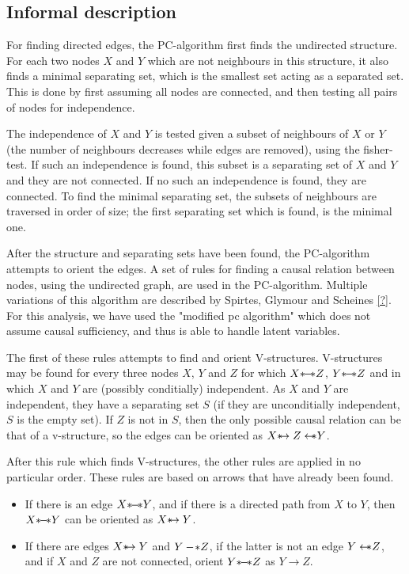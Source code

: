 \documentclass[a4paper, 10pt, english, onecolumn]{article}
\def \srightarrow {\text{\textasteriskcentered}\hspace{-0.62em}\rightarrow}
\def \sleftarrow {\leftarrow\hspace{-0.62em}\text{\textasteriskcentered}}
\def \sleftline {-\hspace{-0.16em}\text{\textasteriskcentered}}
\def \sline {\text{\textasteriskcentered}\hspace{-0.38em}-\hspace{-0.4em}\text{\textasteriskcentered}}
\begin{document}
\subsection{Informal description}
\cite{?}
For finding directed edges, the PC-algorithm first finds the undirected structure.
For each two nodes $X$ and $Y$ which are not neighbours in this structure, it also finds a minimal separating set, which is the smallest set acting as a separated set.
This is done by first assuming all nodes are connected, and then testing all pairs of nodes for independence.

The independence of $X$ and $Y$ is tested given a subset of neighbours of $X$ or $Y$ (the number of neighbours decreases while edges are removed), using the fisher-test.
If such an independence is found, this subset is a separating set of $X$ and $Y$ and they are not connected.
If no such an independence is found, they are connected.
To find the minimal separating set, the subsets of neighbours are traversed in order of size; the first separating set which is found, is the minimal one.

After the structure and separating sets have been found, the PC-algorithm attempts to orient the edges.
A set of rules for finding a causal relation between nodes, using the undirected graph, are used in the PC-algorithm. Multiple variations of this algorithm are described by Spirtes, Glymour and Scheines \ref{?}. For this analysis, we have used the "modified pc algorithm" which does not assume causal sufficiency, and thus is able to handle latent variables.

The first of these rules attempts to find and orient V-structures.
V-structures may be found for every three nodes $X$, $Y$ and $Z$ for which $X \sline Z$, $Y \sline Z$ and in which $X$ and $Y$ are (possibly conditially) independent.
As $X$ and $Y$ are independent, they have a separating set $S$ (if they are unconditially independent, $S$ is the empty set).
If $Z$ is not in $S$, then the only possible causal relation can be that of a v-structure, so the edges can be oriented as $X \srightarrow Z \sleftarrow Y$.


After this rule which finds V-structures, the other rules are applied in no particular order. These rules are based on arrows that have already been found.
\begin{itemize}
\item If there is an edge $X \sline Y$, and if there is a directed path from $X$ to $Y$, then $X \sline Y$ can be oriented as $X \srightarrow Y$.
\item If there are edges $X \srightarrow Y$ and $Y \sleftline Z$, if the latter is not an edge $Y \sleftarrow Z$, and if $X$ and $Z$ are not connected, orient $Y \sline Z$ as $Y \rightarrow Z$. 
\end{itemize}
\end{document}
